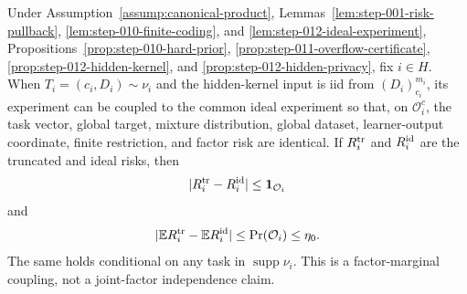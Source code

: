 \begin{proposition}
\label{prop:step-012-identity-coupling}
Under Assumption~\ref{assump:canonical-product},
Lemmas~\ref{lem:step-001-risk-pullback},
\ref{lem:step-010-finite-coding}, and
\ref{lem:step-012-ideal-experiment},
Propositions~\ref{prop:step-010-hard-prior},
\ref{prop:step-011-overflow-certificate},
\ref{prop:step-012-hidden-kernel}, and
\ref{prop:step-012-hidden-privacy}, fix \(i\in H\).  When
\(T_i=(c_i,D_i)\sim\nu_i\) and the hidden-kernel input is iid from
\((D_i)_{c_i}^{m_i}\), its experiment can be coupled to the common ideal
experiment so that, on \(\mathcal O_i^c\), the task vector, global target,
mixture distribution, global dataset, learner-output coordinate, finite
restriction, and factor risk are identical.  If \(R_i^{\rm tr}\) and
\(R_i^{\rm id}\) are the truncated and ideal risks, then
\begin{equation}\label{eq:step-012-pointwise-coupling}
|R_i^{\rm tr}-R_i^{\rm id}|
\le\mathbf1_{\mathcal O_i}
\end{equation}
and
\begin{equation}\label{eq:step-012-expected-coupling}
|\mathbb ER_i^{\rm tr}-\mathbb ER_i^{\rm id}|
\le\Pr(\mathcal O_i)\le\eta_0.
\end{equation}
The same holds conditional on any task in \(\operatorname{supp}\nu_i\).
This is a factor-marginal coupling, not a joint-factor independence claim.
\end{proposition}


